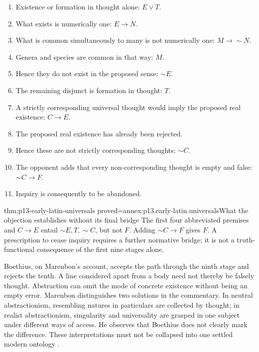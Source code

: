 \begin{enumerate}
\item Existence or formation in thought alone: \(E\lor T\).
\item What exists is numerically one: \(E\to N\).
\item What is common simultaneously to many is not numerically one:
  \(M\to\sim N\).
\item Genera and species are common in that way: \(M\).
\item Hence they do not exist in the proposed sense: \(\sim E\).
\item The remaining disjunct is formation in thought: \(T\).
\item A strictly corresponding universal thought would imply the proposed
  real existence: \(C\to E\).
\item The proposed real existence has already been rejected.
\item Hence these are not strictly corresponding thoughts: \(\sim C\).
\item The opponent adds that every non-corresponding thought is empty
  and false: \(\sim C\to F\).
\item Inquiry is consequently to be abandoned.
\end{enumerate}

\begin{hblemma}{thm:p13-early-latin-universals}
 {proved=annex:p13.early-latin.universals}{What the objection establishes without its final bridge}
The first four abbreviated premises and \(C\to E\) entail
\(\sim E,T,\sim C\), but not \(F\).
Adding \(\sim C\to F\) gives \(F\). A prescription to cease inquiry
requires a further normative bridge; it is not a truth-functional
consequence of the first nine stages alone.
\end{hblemma}

Boethius, on Marenbon's account, accepts the path through the ninth
stage and rejects the tenth. A line considered apart from a body
need not thereby be falsely thought. Abstraction can omit the mode
of concrete existence without being an empty error.
Marenbon distinguishes two solutions in the commentary.
In neutral abstractionism, resembling natures in particulars are
collected by thought; in realist abstractionism, singularity and
universality are grasped in one subject under different ways of access.
He observes that Boethius does not clearly mark the difference.
These interpretations must not be collapsed into one settled modern
ontology \cite[pp.~12--14]{Marenbon2007FordhamEarlyLatin}.

